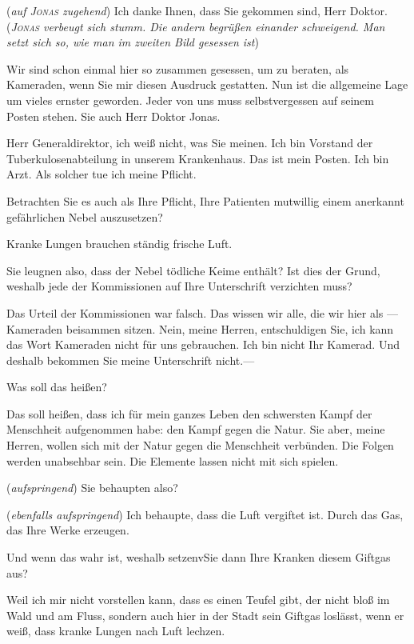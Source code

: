 \documentclass[
	final,
	a4paper,
	ngerman,
	mpinclude = true, %
	twoside = true,
	open = right,
	cleardoublepage = plain,
	DIV = 13,
	BCOR = 1cm,
	titlepage = firstiscover,
	]{scrbook}
\newcommand{\direction}[1]{(\textit{#1})}
\newcommand{\thecharacter}[1]{\textup{\textsc{#1}}\xspace}
\newcommand{\theAlexis}{\thecharacter{Alexis}}
\newcommand{\theJonas}{\thecharacter{Jonas}}
\newcommand{\character}[1]{\item[#1]}
\newcommand{\Generaldirektor}{\character{Direktor}}
\newcommand{\Alexis}{\character{\theAlexis}}
\newcommand{\Jonas}{\character{\theJonas}}
\begin{document}
\begin{play}
\Generaldirektor
\direction{auf \theJonas zugehend} Ich danke Ihnen, dass Sie gekommen sind, Herr Doktor.\direction{\theJonas verbeugt sich stumm. Die andern begrüßen einander schweigend. Man setzt sich so, wie man im zweiten Bild gesessen ist}

\Generaldirektor
Wir sind schon einmal hier so zusammen gesessen, um zu beraten, als Kameraden, wenn Sie mir diesen Ausdruck gestatten. Nun ist die allgemeine Lage um vieles ernster geworden. Jeder von uns muss selbstvergessen auf seinem Posten stehen. Sie auch Herr Doktor Jonas.

\Jonas
Herr Generaldirektor, ich weiß nicht, was Sie meinen. Ich bin Vorstand der Tuberkulosenabteilung in unserem Krankenhaus. Das ist mein Posten. Ich bin Arzt. Als solcher tue ich meine Pflicht.

\Alexis
Betrachten Sie es auch als Ihre Pflicht, Ihre Patienten mutwillig einem anerkannt gefährlichen Nebel auszusetzen?

\Jonas
Kranke Lungen brauchen ständig frische Luft.

\Generaldirektor
Sie leugnen also, dass der Nebel tödliche Keime enthält? Ist dies der Grund, weshalb jede der Kommissionen auf Ihre Unterschrift verzichten muss?

\Jonas
Das Urteil der Kommissionen war falsch. Das wissen wir alle, die wir hier als --- Kameraden beisammen sitzen. Nein, meine Herren, entschuldigen Sie, ich kann das Wort Kameraden nicht für uns gebrauchen. Ich bin nicht Ihr Kamerad. Und deshalb bekommen Sie meine Unterschrift nicht.---

\Generaldirektor
Was soll das heißen?

\Jonas
Das soll heißen, dass ich für mein ganzes Leben den schwersten Kampf der Menschheit aufgenommen habe: den Kampf gegen die Natur. Sie aber, meine Herren, wollen sich mit der Natur gegen die Menschheit verbünden. Die Folgen werden unabsehbar sein. Die Elemente lassen nicht mit sich spielen.

\Alexis
\direction{aufspringend} Sie behaupten also?

\Jonas
\direction{ebenfalls aufspringend} Ich behaupte, dass die Luft vergiftet ist. Durch das Gas, das Ihre Werke erzeugen.

\Alexis
Und wenn das wahr ist, weshalb setzenvSie dann Ihre Kranken diesem Giftgas aus?

\Jonas
Weil ich mir nicht vorstellen kann, dass es einen Teufel gibt, der nicht bloß im Wald und am Fluss, sondern auch hier in der Stadt sein Giftgas loslässt, wenn er weiß, dass kranke Lungen nach Luft lechzen.


\end{play}
\end{document}
